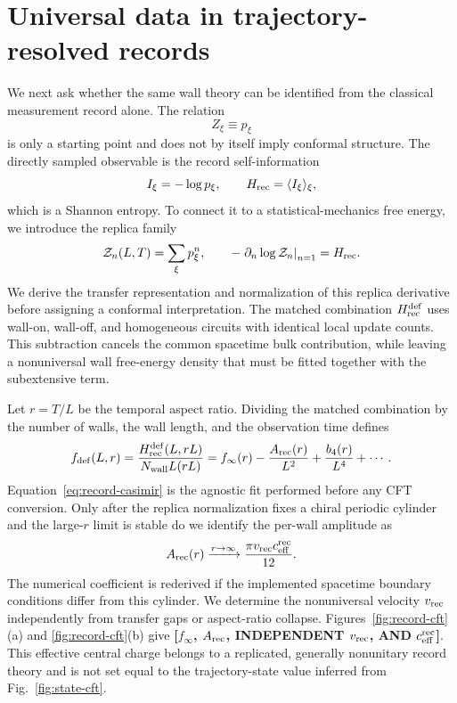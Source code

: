 \documentclass[aps,prx,twocolumn,superscriptaddress,longbibliography,nofootinbib,floatfix]{revtex4-2}
\newcommand{\ResultValue}[1]{\textcolor{BrickRed}{\textbf{[#1]}}}
\begin{document}
\section{Universal data in trajectory-resolved records}
\label{sec:record-cft}

We next ask whether the same wall theory can be identified from the classical measurement record alone.  The relation
\begin{equation}
 Z_\xi\equiv p_\xi
 \label{eq:record-partition}
\end{equation}
is only a starting point and does not by itself imply conformal structure.  The directly sampled observable is the record self-information
\begin{equation}
 I_\xi=-\log p_\xi,
 \qquad H_{\rm rec}=\langle I_\xi\rangle_\xi,
 \label{eq:record-self-information}
\end{equation}
which is a Shannon entropy.  To connect it to a statistical-mechanics free energy, we introduce the replica family
\begin{equation}
 \mathcal Z_n(L,T)=\sum_\xi p_\xi^n,
 \qquad
 -\left.\partial_n\log\mathcal Z_n\right|_{n=1}=H_{\rm rec}.
 \label{eq:record-replica}
\end{equation}
We derive the transfer representation and normalization of this replica derivative before assigning a conformal interpretation.  The matched combination $H_{\rm rec}^{\mathrm{def}}$ uses wall-on, wall-off, and homogeneous circuits with identical local update counts.  This subtraction cancels the common spacetime bulk contribution, while leaving a nonuniversal wall free-energy density that must be fitted together with the subextensive term.

Let $r=T/L$ be the temporal aspect ratio.  Dividing the matched combination by the number of walls, the wall length, and the observation time defines
\begin{equation}
 f_{\rm def}(L,r)
 =\frac{H_{\rm rec}^{\rm def}(L,rL)}{N_{\rm wall}L(rL)}
 =f_\infty(r)-\frac{A_{\rm rec}(r)}{L^2}
 +\frac{b_4(r)}{L^4}+\cdots .
 \label{eq:record-casimir}
\end{equation}
Equation~\eqref{eq:record-casimir} is the agnostic fit performed before any CFT conversion.  Only after the replica normalization fixes a chiral periodic cylinder and the large-$r$ limit is stable do we identify the per-wall amplitude as
\begin{equation}
 A_{\rm rec}(r)\xrightarrow{r\to\infty}
 \frac{\pi v_{\rm rec}c_{\rm eff}^{\rm rec}}{12}.
 \label{eq:record-amplitude}
\end{equation}
The numerical coefficient is rederived if the implemented spacetime boundary conditions differ from this cylinder.  We determine the nonuniversal velocity $v_{\rm rec}$ independently from transfer gaps or aspect-ratio collapse.  Figures~\ref{fig:record-cft}(a) and \ref{fig:record-cft}(b) give \ResultValue{$f_\infty$, $A_{\rm rec}$, INDEPENDENT $v_{\rm rec}$, AND $c_{\rm eff}^{\rm rec}$}.  This effective central charge belongs to a replicated, generally nonunitary record theory and is not set equal to the trajectory-state value inferred from Fig.~\ref{fig:state-cft}.
\end{document}
